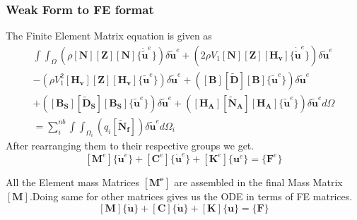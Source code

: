 \documentclass[9pt]{beamer}
\begin{document}
\begin{frame}
\frametitle{Weak Form to FE format}
The Finite Element Matrix equation is given as
\begin{equation*}
\begin{split} 
\int \int_\Omega 
\left(
\rho
\left[ \mathbf{N}  \right]
\left[ \mathbf{Z}  \right]
\left[ \mathbf{N}  \right] 
\{ \ddot{\tilde{\mathbf{u}}}^e \}
\right) 
\delta \tilde{\mathbf{u}}^e
+
\left( 
2 \rho V_1
\left[ \mathbf{N}  \right]
\left[ \mathbf{Z}  \right]
\left[ \mathbf{H_v}  \right] 
\{ \dot{\tilde{\mathbf{u}}}^e \}
\right) 
\delta \tilde{\mathbf{u}}^e \\
-
\left( 
 \rho V_1^2
\left[ \mathbf{H_v}  \right]
\left[ \mathbf{Z}  \right]
\left[ \mathbf{H_v}  \right] 
\{\tilde{\mathbf{u}}^e \}
\right) 
\delta \tilde{\mathbf{u}}^e  
+
\left( 
\left[ \mathbf{B}  \right]
\left[ \mathbf{\tilde{D}}  \right]
\left[ \mathbf{B}  \right] 
\{\tilde{\mathbf{u}}^e \}
\right) 
\delta \tilde{\mathbf{u}}^e  \\
+
\left( 
\left[ \mathbf{B_S}  \right]
\left[ \mathbf{\tilde{D}_S}  \right]
\left[ \mathbf{B_S}  \right] 
\{\tilde{\mathbf{u}}^e \}
\right) 
\delta \tilde{\mathbf{u}}^e
+
\left( 
\left[ \mathbf{H_A}  \right]
\left[ \mathbf{\tilde{N}_A}  \right]
\left[ \mathbf{H_A}  \right] 
\{\tilde{\mathbf{u}}^e \}
\right) 
\delta \tilde{\mathbf{u}}^e
d \Omega
   \\
 =   
 \sum_i^{nb}   \int  \int_{\Omega_i} 
\left(  
 q_i 
\left[ \mathbf{\tilde{N}_f}  \right] 
\right)  
\delta \tilde{\mathbf{u}}^e
  d \Omega_i  
\end{split} 
\end{equation*}
After rearranging them to their respective groups we get.
\begin{equation*}
\left[ \mathbf{M}^e  \right] 
\{ \ddot{\mathbf{u}}^e \}
+
\left[ \mathbf{C}^e  \right] 
\{ \dot{\mathbf{u}}^e \}
+
\left[ \mathbf{K}^e  \right] 
\{\mathbf{u}^e \}
=
\{ \mathbf{F}^e \}
\end{equation*}

All the Element mass Matrices $\left[ \mathbf{M^e}  \right]$ are assembled in the final Mass Matrix $\left[ \mathbf{M} \right]$.Doing same for other matrices gives us the ODE in terms of FE matrices.
\begin{equation*}
\left[ \mathbf{M}  \right] 
\{ \ddot{\mathbf{u}} \}
+
\left[ \mathbf{C}  \right] 
\{ \dot{\mathbf{u}} \}
+
\left[ \mathbf{K}  \right] 
\{\mathbf{u} \}
=
\{ \mathbf{F} \}
\end{equation*}
\end{frame}
\end{document}
